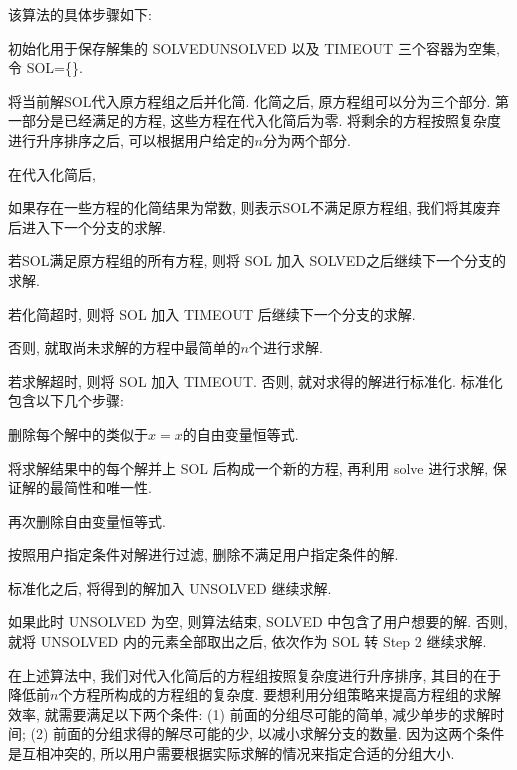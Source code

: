 该算法的具体步骤如下:
\begin{compactenum}[Step 1.]
\item 初始化用于保存解集的 SOLVED\D UNSOLVED 以及 TIMEOUT 三个容器为空集, 令 SOL=\{\}. 
\item 将当前解SOL代入原方程组之后并化简. 化简之后, 原方程组可以分为三个部分. 第一部分是已经满足的方程, 这些方程在代入化简后为零. 将剩余的方程按照复杂度进行升序排序之后, 可以根据用户给定的$n$分为两个部分. 
\item 在代入化简后, 
    \begin{compactenum}[(a)]
    \item 如果存在一些方程的化简结果为常数, 则表示SOL不满足原方程组, 我们将其废弃后进入下一个分支的求解. 
    \item 若SOL满足原方程组的所有方程, 则将 SOL 加入 SOLVED之后继续下一个分支的求解. 
    \item 若化简超时, 则将 SOL 加入 TIMEOUT 后继续下一个分支的求解. 
    \item 否则, 就取尚未求解的方程中最简单的$n$个进行求解.
    \end{compactenum}
\item 若求解超时, 则将 SOL 加入 TIMEOUT. 否则, 就对求得的解进行标准化. 标准化包含以下几个步骤:
    \begin{compactenum}[(1)]
    \item 删除每个解中的类似于$x=x$的自由变量恒等式.
    \item 将求解结果中的每个解并上 SOL 后构成一个新的方程, 再利用 solve 进行求解, 保证解的最简性和唯一性. 
    \item 再次删除自由变量恒等式.
    \item 按照用户指定条件对解进行过滤, 删除不满足用户指定条件的解. 
    \end{compactenum}
\item 标准化之后, 将得到的解加入 UNSOLVED 继续求解. 
\item 如果此时 UNSOLVED 为空, 则算法结束, SOLVED 中包含了用户想要的解. 否则, 就将 UNSOLVED 内的元素全部取出之后, 依次作为 SOL 转 Step 2 继续求解. 
\end{compactenum}

在上述算法中, 我们对代入化简后的方程组按照复杂度进行升序排序, 其目的在于降低前$n$个方程所构成的方程组的复杂度.  要想利用分组策略来提高方程组的求解效率, 就需要满足以下两个条件: (1) 前面的分组尽可能的简单, 减少单步的求解时间; (2) 前面的分组求得的解尽可能的少, 以减小求解分支的数量. 因为这两个条件是互相冲突的, 所以用户需要根据实际求解的情况来指定合适的分组大小. 

